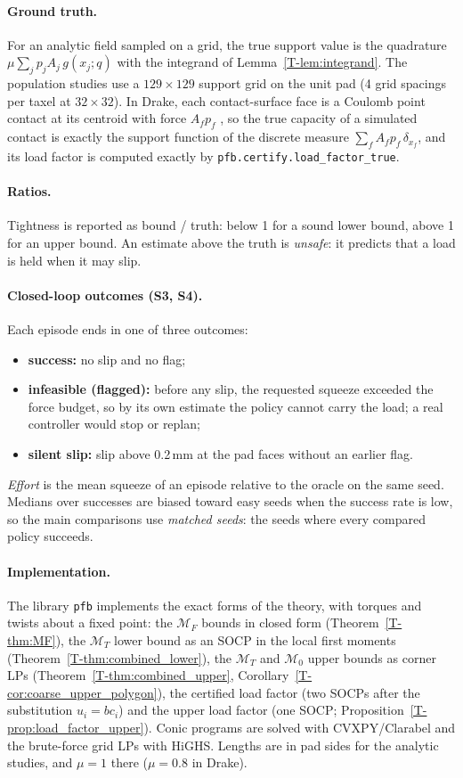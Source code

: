 \documentclass[11pt,a4paper]{article}
\newcommand{\M}{\mathcal M}
\newcommand{\T}[1]{\ref{T-#1}}                       %
\newcommand{\code}[1]{\texttt{#1}}
\begin{document}
\paragraph{Ground truth.} For an analytic field sampled on a grid, the true support value is the quadrature $\mu\sum_jp_jA_j\,g(x_j;q)$ with the
integrand of Lemma~\T{lem:integrand}. The population studies use a $129\times129$ support grid on the unit pad (4 grid spacings per taxel at
$32\times32$). In Drake, each contact-surface face is a Coulomb point contact at its centroid with force
$A_fp_f$ \citep{masterjohn2022velocity}, so the true capacity of a simulated contact is exactly the support function of the discrete measure
$\sum_fA_fp_f\,\delta_{x_f}$, and its load factor is computed exactly by \code{pfb.certify.load\_factor\_true}.

\paragraph{Ratios.} Tightness is reported as bound / truth: below 1 for a sound lower bound, above 1 for an upper bound. An estimate above the
truth is \emph{unsafe}: it predicts that a load is held when it may slip.

\paragraph{Closed-loop outcomes (S3, S4).} Each episode ends in one of three outcomes:
\begin{itemize}
    \item \textbf{success:} no slip and no flag;
    \item \textbf{infeasible (flagged):} before any slip, the requested squeeze exceeded the force budget, so by its own estimate the policy cannot
    carry the load; a real controller would stop or replan;
    \item \textbf{silent slip:} slip above 0.2\,mm at the pad faces without an earlier flag.
\end{itemize}
\emph{Effort} is the mean squeeze of an episode relative to the oracle on the same seed. Medians over successes are biased toward easy seeds
when the success rate is low, so the main comparisons use \emph{matched seeds}: the seeds where every compared policy succeeds.

\paragraph{Implementation.} The library \code{pfb} implements the exact forms of the theory, with torques and twists about a fixed point: the
$\M_F$ bounds in closed form (Theorem~\T{thm:MF}), the $\M_T$ lower bound as an SOCP in the local first moments (Theorem~\T{thm:combined_lower}), the
$\M_T$ and $\M_0$ upper bounds as corner LPs (Theorem~\T{thm:combined_upper}, Corollary~\T{cor:coarse_upper_polygon}), the certified load factor (two SOCPs
after the substitution $u_i=bc_i$) and the upper load factor (one SOCP; Proposition~\T{prop:load_factor_upper}). Conic programs are solved with CVXPY/Clarabel and the
brute-force grid LPs with HiGHS. Lengths are in pad sides for the analytic studies, and $\mu=1$ there ($\mu=0.8$ in Drake).
\end{document}
